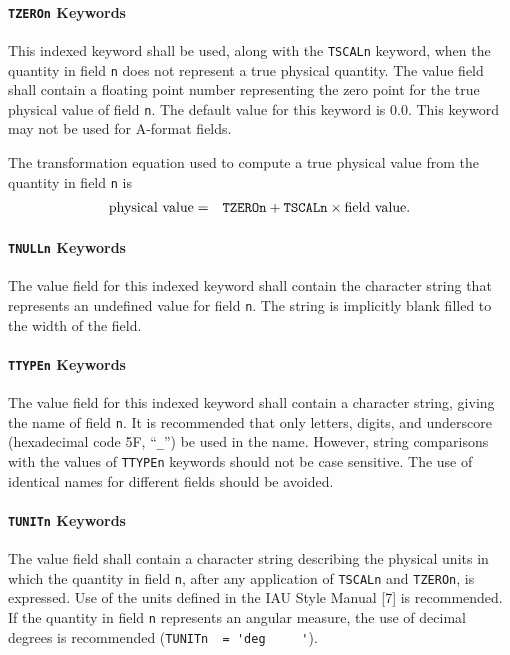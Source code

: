    \paragraph{{\tt TZEROn} Keywords}
 This indexed keyword shall be used, along with the {\tt TSCALn} keyword,
 when the quantity in field {\tt n} does not represent a
true
 physical quantity.  The value field shall contain a 
 floating point number representing the zero point 
 for the true physical value of field {\tt n}.  The default
 value for this keyword is 0.0.  This keyword may 
 not be used for A-format fields.

 The transformation equation used to compute a true
 physical value from the quantity in field {\tt n} is
\begin{eqnarray}                                      
   \mbox{physical value} & = & \mbox{{\tt TZEROn}} + \mbox{{\tt
TSCALn}}
                               \times \mbox{field value}. \label{eq:tscl}
\end{eqnarray}
 
   \paragraph{{\tt TNULLn} Keywords}
 The value field for this indexed keyword shall contain 
 the character
 string that represents 
 an undefined value for field {\tt n}. 
 The string is implicitly blank filled to the width of the field.
 
   \paragraph{{\tt TTYPEn} Keywords}
 The value field for this indexed keyword shall contain a
 character string, giving the name of field {\tt n}.  It is recommended 
 that only letters, digits, and 
 underscore (hexadecimal code 5F, ``{\tt \_}'')
 be used in the name.  However, string comparisons with the values 
 of {\tt TTYPEn} keywords should not be case sensitive. 
 The use of identical names for
 different fields should be avoided.
 
   \paragraph{{\tt TUNITn} Keywords}
 The value field shall contain a character 
 string describing the physical units 
 in which the quantity in field 
 {\tt n}, after any application of {\tt TSCALn}
 and {\tt TZEROn}, is expressed.  
 Use of the units defined in the 
 IAU Style Manual [7] is recommended. 
 If the quantity in field {\tt n} represents an 
 angular measure,
 the use of decimal degrees is recommended 
 (\verb*+TUNITn  = 'deg     '+).

